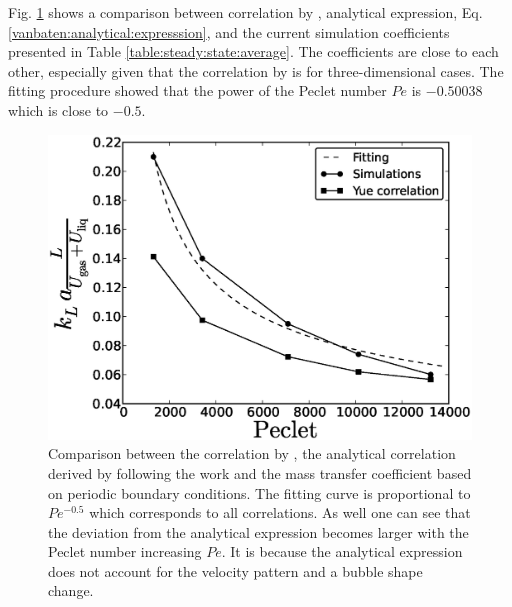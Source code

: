 \documentclass{article}
\begin{document}
Fig. \ref{fig:volume:mass:coefficient} shows a comparison between correlation by
\citet{yue-mass}, analytical expression, Eq. \ref{vanbaten:analytical:expresssion}, and the current
simulation coefficients presented in Table
\ref{table:steady:state:average}. The coefficients are close to each other, especially given that
the correlation by \citet{yue-mass} is for three-dimensional cases. The fitting procedure showed
that the power of
the Peclet number $Pe$ is $-0.50038$ which is close to $-0.5$. 
\begin{figure}[htb!]
\includegraphics[width=\textwidth]{Figures/correlations_comparison.eps}
\caption{Comparison between the correlation by \citet{yue-mass}, the analytical correlation derived by following the work
\cite{irandoust} and the mass transfer coefficient based
on periodic boundary conditions. The fitting curve is proportional to $Pe^{-0.5}$ which corresponds
to all correlations. As well one can see that the deviation from the analytical expression becomes
larger with the Peclet number increasing $Pe$. It is because the analytical expression does not account for the velocity pattern and a bubble
shape change.\label{fig:volume:mass:coefficient}}
\end{figure}
\end{document}
